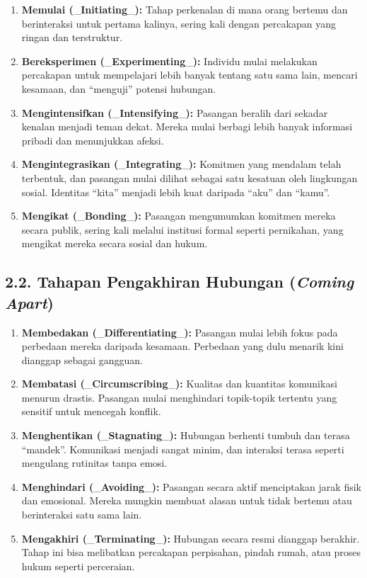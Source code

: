 \documentclass[
  letterpaper,
  DIV=11,
  numbers=noendperiod]{scrreprt}
\providecommand{\tightlist}{%
  \setlength{\itemsep}{0pt}\setlength{\parskip}{0pt}}
\begin{document}
\begin{enumerate}
\def\labelenumi{\arabic{enumi}.}
\tightlist
\item
  \textbf{Memulai (}\_\textbf{Initiating}\_\textbf{):} Tahap perkenalan
  di mana orang bertemu dan berinteraksi untuk pertama kalinya, sering
  kali dengan percakapan yang ringan dan terstruktur.
\item
  \textbf{Bereksperimen (}\_\textbf{Experimenting}\_\textbf{):} Individu
  mulai melakukan percakapan untuk mempelajari lebih banyak tentang satu
  sama lain, mencari kesamaan, dan ``menguji'' potensi hubungan.
\item
  \textbf{Mengintensifkan (}\_\textbf{Intensifying}\_\textbf{):}
  Pasangan beralih dari sekadar kenalan menjadi teman dekat. Mereka
  mulai berbagi lebih banyak informasi pribadi dan menunjukkan afeksi.
\item
  \textbf{Mengintegrasikan (}\_\textbf{Integrating}\_\textbf{):}
  Komitmen yang mendalam telah terbentuk, dan pasangan mulai dilihat
  sebagai satu kesatuan oleh lingkungan sosial. Identitas ``kita''
  menjadi lebih kuat daripada ``aku'' dan ``kamu''.
\item
  \textbf{Mengikat (}\_\textbf{Bonding}\_\textbf{):} Pasangan
  mengumumkan komitmen mereka secara publik, sering kali melalui
  institusi formal seperti pernikahan, yang mengikat mereka secara
  sosial dan hukum.
\end{enumerate}

\subsection{\texorpdfstring{2.2. Tahapan Pengakhiran Hubungan
(\emph{Coming
Apart})}{2.2. Tahapan Pengakhiran Hubungan (Coming Apart)}}\label{tahapan-pengakhiran-hubungan-coming-apart}

\begin{enumerate}
\def\labelenumi{\arabic{enumi}.}
\tightlist
\item
  \textbf{Membedakan (}\_\textbf{Differentiating}\_\textbf{):} Pasangan
  mulai lebih fokus pada perbedaan mereka daripada kesamaan. Perbedaan
  yang dulu menarik kini dianggap sebagai gangguan.
\item
  \textbf{Membatasi (}\_\textbf{Circumscribing}\_\textbf{):} Kualitas
  dan kuantitas komunikasi menurun drastis. Pasangan mulai menghindari
  topik-topik tertentu yang sensitif untuk mencegah konflik.
\item
  \textbf{Menghentikan (}\_\textbf{Stagnating}\_\textbf{):} Hubungan
  berhenti tumbuh dan terasa ``mandek''. Komunikasi menjadi sangat
  minim, dan interaksi terasa seperti mengulang rutinitas tanpa emosi.
\item
  \textbf{Menghindari (}\_\textbf{Avoiding}\_\textbf{):} Pasangan secara
  aktif menciptakan jarak fisik dan emosional. Mereka mungkin membuat
  alasan untuk tidak bertemu atau berinteraksi satu sama lain.
\item
  \textbf{Mengakhiri (}\_\textbf{Terminating}\_\textbf{):} Hubungan
  secara resmi dianggap berakhir. Tahap ini bisa melibatkan percakapan
  perpisahan, pindah rumah, atau proses hukum seperti perceraian.
\end{enumerate}
\end{document}
